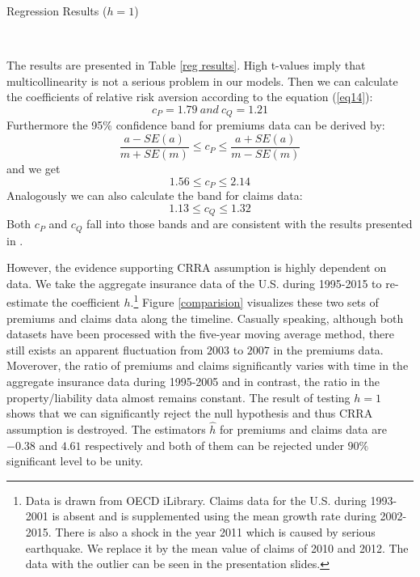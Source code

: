 \documentclass[11pt, a4paper, leqno]{article}
\begin{document}
\begin{table}[H]
\renewcommand{\arraystretch}{1.5}
\centering
{}
\caption{Regression Results ($h=1$)}
\\
\label{reg results}
\end{table}

The results are presented in Table \ref{reg results}. High t-values imply that multicollinearity is not a serious problem in our models. Then we can calculate the coefficients of relative risk aversion according to the equation (\ref{eq14}):
$$c_P=1.79\ and\ c_Q=1.21$$
Furthermore the 95\% confidence band for premiums data can be derived by:
$$\frac{a-SE(a)}{m+SE(m)}\le c_P \le \frac{a+SE(a)}{m-SE(m)}$$
and we get 
$$1.56\le c_P \le 2.14$$
Analogously we can also calculate the band for claims data:
$$1.13\le c_Q \le 1.32$$
Both $c_P$ and $c_Q$ fall into those bands and are consistent with the results presented in \citet{szpiro1986measuring}.

However, the evidence supporting CRRA assumption is highly dependent on data. We take the aggregate insurance data of the U.S. during 1995-2015 to re-estimate the coefficient $h$.\footnote{Data is drawn from OECD iLibrary. Claims data for the U.S. during 1993-2001 is absent and is supplemented using the mean growth rate during 2002-2015. There is also a shock in the year 2011 which is caused by serious earthquake. We replace it by the mean value of claims of 2010 and 2012. The data with the outlier can be seen in the presentation slides.} Figure \ref{comparision} visualizes these two sets of premiums and claims data along the timeline. Casually speaking, although both datasets have been processed with the five-year moving average method, there still exists an apparent fluctuation from $2003$ to $2007$ in the premiums data. Moverover, the ratio of premiums and claims significantly varies with time in the aggregate insurance data during 1995-2005 and in contrast, the ratio in the property/liability data almost remains constant. The result of testing $h=1$ shows that we can significantly reject the null hypothesis and thus CRRA assumption is destroyed. The estimators $\hat{h}$ for premiums and claims data are $-0.38$ and $4.61$ respectively and both of them can be rejected under $90\%$ significant level to be unity.
\end{document}
